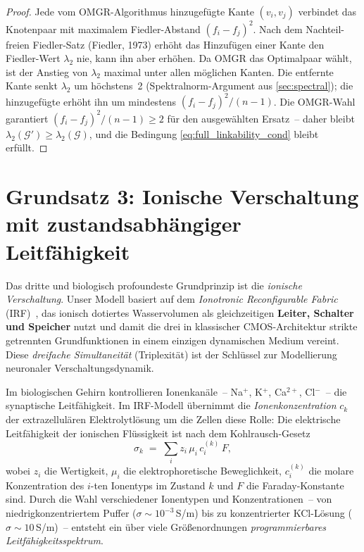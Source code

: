 \documentclass[12pt, a4paper, openany]{report}
\newcommand{\calG}{\mathcal{G}}
\begin{document}
\begin{proof}
Jede vom OMGR-Algorithmus hinzugefügte Kante $(v_i, v_j)$ verbindet das
Knotenpaar mit maximalem Fiedler-Abstand $(f_i - f_j)^2$.  Nach dem
Nachteil-freien Fiedler-Satz (Fiedler, 1973) erhöht das Hinzufügen einer
Kante den Fiedler-Wert $\lambda_2$ nie, kann ihn aber erhöhen.  Da OMGR
das Optimalpaar wählt, ist der Anstieg von $\lambda_2$ maximal unter allen
möglichen Kanten.  Die entfernte Kante senkt $\lambda_2$ um höchstens~2
(Spektralnorm-Argument aus \cref{sec:spectral}); die hinzugefügte erhöht
ihn um mindestens $(f_i - f_j)^2 / (n-1)$.  Die OMGR-Wahl garantiert
$(f_i - f_j)^2 / (n-1) \geq 2$ für den ausgewählten Ersatz~-- daher bleibt
$\lambda_2(\calG') \geq \lambda_2(\calG)$, und die Bedingung
\eqref{eq:full_linkability_cond} bleibt erfüllt.
\end{proof}

\section{Grundsatz 3: Ionische Verschaltung mit zustandsabhängiger Leitfähigkeit}
\label{sec:bio_ionic}

Das dritte und biologisch profoundeste Grundprinzip ist die \emph{ionische
Verschaltung}.  Unser Modell basiert auf dem \emph{Ionotronic Reconfigurable
Fabric} (IRF)~\cite{epp2026iono}, das ionisch dotiertes Wasservolumen als
gleichzeitigen \textbf{Leiter, Schalter und Speicher} nutzt und damit die
drei in klassischer CMOS-Architektur strikte getrennten Grundfunktionen in
einem einzigen dynamischen Medium vereint.  Diese \emph{dreifache
Simultaneität} (Triplexität) ist der Schlüssel zur Modellierung neuronaler
Verschaltungsdynamik.

Im biologischen Gehirn kontrollieren Ionen\-kanäle~-- Na$^+$, K$^+$,
Ca$^{2+}$, Cl$^-$~-- die synaptische Leitfähigkeit.  Im IRF-Modell
übernimmt die \emph{Ionenkonzentration} $c_k$ der extrazellulären Elektrolyt\-lösung
um die Zellen diese Rolle: Die elektrische Leitfähigkeit der ionischen
Flüssigkeit ist nach dem Kohlrausch-Gesetz~\cite{epp2026iono}
\begin{equation}
  \label{eq:iono_conductivity}
  \sigma_k \;=\; \sum_i z_i \,\mu_i \,c_i^{(k)}\, F,
\end{equation}
wobei $z_i$ die Wertigkeit, $\mu_i$ die elektrophoretische Beweglichkeit,
$c_i^{(k)}$ die molare Konzentration des $i$-ten Ionentyps im Zustand $k$
und $F$ die Faraday-Konstante sind.  Durch die Wahl verschiedener Ionentypen
und Konzentrationen~-- von nied\-rig\-konzentriertem Puffer ($\sigma \sim
10^{-3}$\,S/m) bis zu konzentrierter KCl-Lösung ($\sigma \sim 10$\,S/m)~--
entsteht ein über viele Größenordnungen \emph{programmierbares
Leitfähigkeitsspektrum}.
\end{document}
